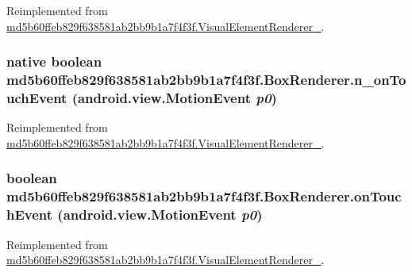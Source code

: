 Reimplemented from \hyperlink{classmd5b60ffeb829f638581ab2bb9b1a7f4f3f_1_1_visual_element_renderer__1_4a1c180026d8eab71549e47b7de4b9b8}{md5b60ffeb829f638581ab2bb9b1a7f4f3f.VisualElementRenderer\_}.\hypertarget{classmd5b60ffeb829f638581ab2bb9b1a7f4f3f_1_1_box_renderer_532fa996338f3b4215d83e4573b83166}{
\subsubsection[{n\_\-onTouchEvent}]{\setlength{\rightskip}{0pt plus 5cm}native boolean md5b60ffeb829f638581ab2bb9b1a7f4f3f.BoxRenderer.n\_\-onTouchEvent (android.view.MotionEvent {\em p0})}}
\label{classmd5b60ffeb829f638581ab2bb9b1a7f4f3f_1_1_box_renderer_532fa996338f3b4215d83e4573b83166}




Reimplemented from \hyperlink{classmd5b60ffeb829f638581ab2bb9b1a7f4f3f_1_1_visual_element_renderer__1_bf46ffd446313b87383a085a60d65dd4}{md5b60ffeb829f638581ab2bb9b1a7f4f3f.VisualElementRenderer\_}.\hypertarget{classmd5b60ffeb829f638581ab2bb9b1a7f4f3f_1_1_box_renderer_7dbb553b416a3c1e05c3c31699665a75}{
\subsubsection[{onTouchEvent}]{\setlength{\rightskip}{0pt plus 5cm}boolean md5b60ffeb829f638581ab2bb9b1a7f4f3f.BoxRenderer.onTouchEvent (android.view.MotionEvent {\em p0})}}
\label{classmd5b60ffeb829f638581ab2bb9b1a7f4f3f_1_1_box_renderer_7dbb553b416a3c1e05c3c31699665a75}




Reimplemented from \hyperlink{classmd5b60ffeb829f638581ab2bb9b1a7f4f3f_1_1_visual_element_renderer__1_3beb6d0ebf9e1eca68fed2eac13c88ac}{md5b60ffeb829f638581ab2bb9b1a7f4f3f.VisualElementRenderer\_}.

